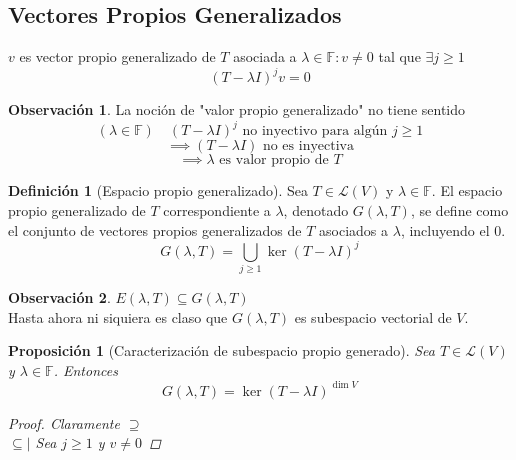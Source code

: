\documentclass[11pt]{book}
\newcommand{\set}[1]{\mathbb{#1}}
\newtheorem{prop}[thm]{Proposición}
\theoremstyle{definition}
\newtheorem{defn}{Definición}[section]
\newtheorem{obs}{Observación}[section]
\begin{document}
\subsection{Vectores Propios Generalizados}
$v$ es vector propio generalizado de $T$ asociada a $\lambda\in\set{F}:v\neq 0$ tal que $\exists j\geq 1$
\[(T-\lambda I)^jv=0\]
\begin{obs}
	La noción de "valor propio generalizado" no tiene sentido
	\[(\lambda\in\set{F})\quad(T-\lambda I)^j\textrm{ no inyectivo para algún }j\geq 1\]
	\[\implies (T-\lambda I)\textrm{ no es inyectiva}\]
	\[\implies \lambda \textrm{ es valor propio de }T\]
\end{obs}
\begin{defn}[Espacio propio generalizado]
	Sea $T\in\mathcal{L}(V)$ y $\lambda\in\set{F}$. El espacio propio generalizado de $T$ correspondiente a $\lambda$, denotado $G(\lambda, T)$, se define como el conjunto de vectores propios generalizados de $T$ asociados a $\lambda$, incluyendo el $0$.
	\[G(\lambda,T)=\bigcup_{j\geq 1}\ker(T-\lambda I)^j\]
	\begin{obs}
		$E(\lambda,T)\subseteq G(\lambda,T)$\\
		Hasta ahora ni siquiera es claso que $G(\lambda,T)$ es subespacio vectorial de $V$.
	\end{obs}
\end{defn}
\begin{prop}[Caracterización de subespacio propio generado]
	Sea $T\in\mathcal{L}(V)$ y $\lambda\in\set{F}$. Entonces
	\[G(\lambda,T)=\ker(T-\lambda I)^{\dim V}\]
	\begin{proof}
		Claramente $\supseteq$\\
		\underline{$\subseteq|$} Sea $j\geq 1$ y $v\neq 0$
	\end{proof}
\end{prop}
\end{document}
